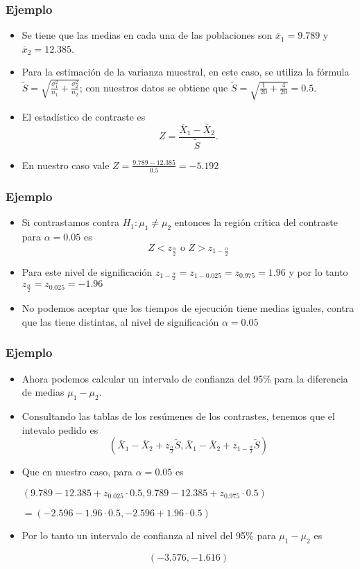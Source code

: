 \begin{frame}
\frametitle{Ejemplo}
\begin{itemize}
\item Se tiene que las medias en cada una de las poblaciones son $\overline{x}_1= 9.789$ y $\overline{x}_2=12.385$.
\item Para la estimación de la varianza muestral, en este caso, se utiliza la fórmula 
$\tilde{S}=\sqrt{\frac{\sigma_1^2}{n_1}+\frac{\sigma_2^2}{n_2}}$; con nuestros datos se obtiene que  $\tilde{S}=\sqrt{\frac{1}{20}+\frac{4}{20}}=0.5$.
\item El estadístico de contraste 
es $$Z=\frac{\overline{X}_1-\overline{X}_2}{\tilde{S}}.$$
\item En nuestro caso vale $Z=\frac{9.789-12.385}{0.5}=-5.192$
\end{itemize}
\end{frame}

\begin{frame}
\frametitle{Ejemplo}
\begin{itemize}
\item Si contrastamos contra $H_1: \mu_1\not=\mu_2$ entonces la región crítica del contraste para $\alpha=0.05$ es
$$Z< z_{\frac{\alpha}{2}} \mbox{ o } Z>z_{1-\frac{\alpha}{2}}$$ 
\item Para este nivel de significación $z_{1-\frac{\alpha}{2}}=z_{1- 0.025}=z_{0.975}=1.96$ y por lo tanto 
$ z_{\frac{\alpha}{2}}=z_{0.025}=-1.96$
\item No podemos aceptar que los tiempos de ejecución tiene medias iguales, contra que las tiene distintas, al nivel de significación $\alpha=0.05$
\end{itemize}
\end{frame}

\begin{frame}
\frametitle{Ejemplo}
\begin{itemize}
\item Ahora podemos calcular un intervalo de confianza del 95\% para la diferencia de medias $\mu_1-\mu_2$.
\item Consultando las tablas de los resúmenes de los contrastes, tenemos que el intevalo pedido es 
$$\left(\overline{X}_1 -\overline{X}_2
+z_{\frac{\alpha}{2}}\tilde{S},
\overline{X}_1 -\overline{X}_2
+z_{1-\frac{\alpha}{2}}\tilde{S}\right)$$
\item Que en nuestro caso, para $\alpha=0.05$ es 

$\left(9.789-12.385
+z_{0.025}\cdot{0.5},
9.789-12.385
+z_{0.975}\cdot {0.5}\right)$

$= \left(-2.596-1.96\cdot 0.5,  -2.596+1.96\cdot 0.5\right)$
\item Por lo tanto un intervalo de confianza al nivel del 95\% para $\mu_1-\mu_2$
 es 
 
 $$\left(  -3.576 ,  -1.616\right)$$
 
\end{itemize}
\end{frame}

